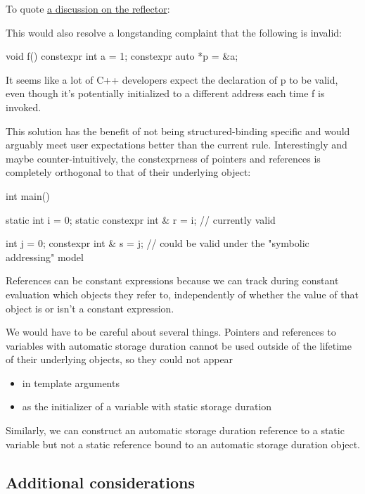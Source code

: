 \documentclass{wg21}
\begin{document}
To quote \href{https://lists.isocpp.org/core/2023/04/14163.php}{a discussion on the reflector}:

\begin{quoteblock}
This would also resolve a longstanding complaint that the following is invalid:
\begin{colorblock}
void f() {
    constexpr int a = 1;
    constexpr auto *p = &a;
}
\end{colorblock}

It seems like a lot of C++ developers expect the declaration of p to be valid, even though it's potentially initialized to a different address each time f is invoked.
\end{quoteblock}

This solution has the benefit of not being structured-binding specific and would arguably meet user expectations better than the current rule.
Interestingly and maybe counter-intuitively, the constexprness of pointers and references is completely orthogonal to that of their underlying object:

\begin{colorblock}
int main() {
    static int i = 0;
    static constexpr int & r = i; // currently valid

    int j = 0;
    constexpr int & s = j; // could be valid under the "symbolic addressing" model
}
\end{colorblock}

References can be constant expressions because we can track during constant evaluation which objects they refer to, independently of whether the value of that object is or isn't a constant expression.

We would have to be careful about several things.
Pointers and references to variables with automatic storage duration cannot be used outside of the lifetime of their underlying objects, so they could not appear
\begin{itemize}
  \item in template arguments
  \item as the initializer of a variable with static storage duration
\end{itemize}

Similarly, we can construct an automatic storage duration  reference to a static variable but not a static  reference bound to an automatic storage duration object.

\subsection{Additional considerations}
\end{document}

